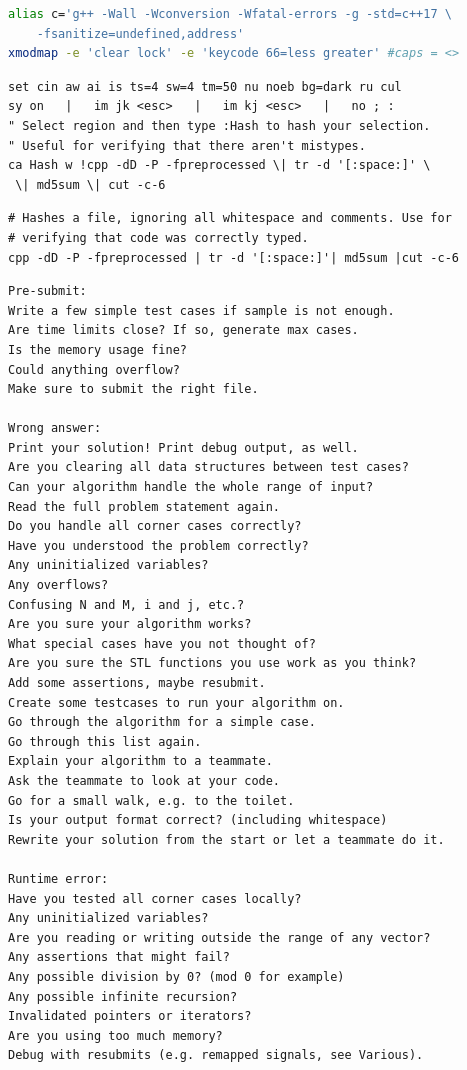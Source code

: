 \begin{multicols}{\Columns}
\begin{lstlisting}[language=bash]
alias c='g++ -Wall -Wconversion -Wfatal-errors -g -std=c++17 \
	-fsanitize=undefined,address'
xmodmap -e 'clear lock' -e 'keycode 66=less greater' #caps = <>
\end{lstlisting}

\begin{lstlisting}[language=raw]
set cin aw ai is ts=4 sw=4 tm=50 nu noeb bg=dark ru cul
sy on   |   im jk <esc>   |   im kj <esc>   |   no ; :
" Select region and then type :Hash to hash your selection.
" Useful for verifying that there aren't mistypes.
ca Hash w !cpp -dD -P -fpreprocessed \| tr -d '[:space:]' \
 \| md5sum \| cut -c-6
\end{lstlisting}

\begin{lstlisting}[language=raw]
# Hashes a file, ignoring all whitespace and comments. Use for
# verifying that code was correctly typed.
cpp -dD -P -fpreprocessed | tr -d '[:space:]'| md5sum |cut -c-6
\end{lstlisting}

\begin{lstlisting}[language=raw]
Pre-submit:
Write a few simple test cases if sample is not enough.
Are time limits close? If so, generate max cases.
Is the memory usage fine?
Could anything overflow?
Make sure to submit the right file.

Wrong answer:
Print your solution! Print debug output, as well.
Are you clearing all data structures between test cases?
Can your algorithm handle the whole range of input?
Read the full problem statement again.
Do you handle all corner cases correctly?
Have you understood the problem correctly?
Any uninitialized variables?
Any overflows?
Confusing N and M, i and j, etc.?
Are you sure your algorithm works?
What special cases have you not thought of?
Are you sure the STL functions you use work as you think?
Add some assertions, maybe resubmit.
Create some testcases to run your algorithm on.
Go through the algorithm for a simple case.
Go through this list again.
Explain your algorithm to a teammate.
Ask the teammate to look at your code.
Go for a small walk, e.g. to the toilet.
Is your output format correct? (including whitespace)
Rewrite your solution from the start or let a teammate do it.

Runtime error:
Have you tested all corner cases locally?
Any uninitialized variables?
Are you reading or writing outside the range of any vector?
Any assertions that might fail?
Any possible division by 0? (mod 0 for example)
Any possible infinite recursion?
Invalidated pointers or iterators?
Are you using too much memory?
Debug with resubmits (e.g. remapped signals, see Various).


\end{lstlisting}
\end{multicols}
